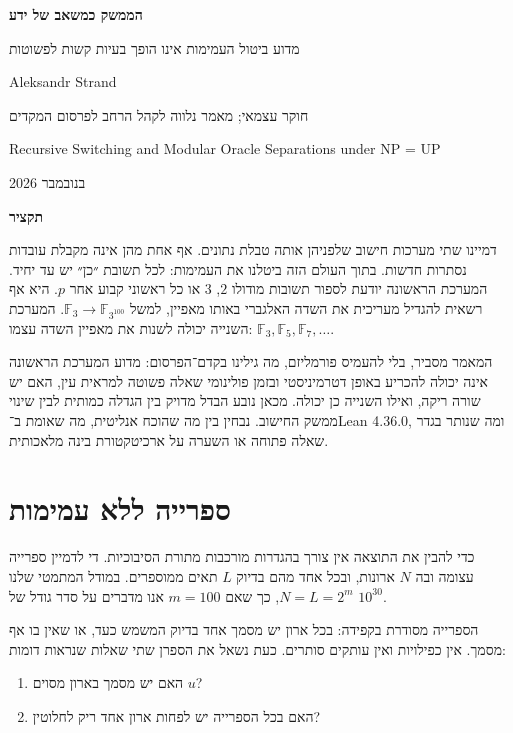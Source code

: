 \documentclass[11pt,a4paper]{article}
\newcommand{\EN}[1]{\textenglish{#1}}
\newcommand{\FF}{\mathbb F}
\begin{document}
\begin{center}
{\color{ink}\LARGE\bfseries הממשק כמשאב של ידע\par}
\vspace{2mm}
{\large מדוע ביטול העמימות אינו הופך בעיות קשות לפשוטות\par}
\vspace{3mm}
\EN{Aleksandr Strand}\par
חוקר עצמאי; מאמר נלווה לקהל הרחב לפרסום המקדים\par
\EN{Recursive Switching and Modular Oracle Separations under NP = UP}\par
{} בנובמבר 2026
\end{center}

\begin{center}\textbf{תקציר}\end{center}
דמיינו שתי מערכות חישוב שלפניהן אותה טבלת נתונים. אף אחת מהן אינה מקבלת עובדות נסתרות חדשות. בתוך העולם הזה ביטלנו את העמימות: לכל תשובת ״כן״ יש עד יחיד. המערכת הראשונה יודעת לספור תשובות מודולו $2$, $3$ או כל ראשוני קבוע אחר $p$. היא אף רשאית להגדיל מעריכית את השדה האלגברי באותו מאפיין, למשל $\FF_3\to\FF_{3^{100}}$. המערכת השנייה יכולה לשנות את מאפיין השדה עצמו: $\FF_3,\FF_5,\FF_7,\dots$.

המאמר מסביר, בלי להעמיס פורמליזם, מה גילינו בקדם־הפרסום: מדוע המערכת הראשונה אינה יכולה להכריע באופן דטרמיניסטי ובזמן פולינומי שאלה פשוטה למראית עין, האם יש שורה ריקה, ואילו השנייה כן יכולה. מכאן נובע הבדל מדויק בין הגדלה כמותית לבין שינוי ממשק החישוב. נבחין בין מה שהוכח אנליטית, מה שאומת ב־\EN{Lean 4.36.0}, ומה שנותר בגדר שאלה פתוחה או השערה על ארכיטקטורת בינה מלאכותית.

\section{ספרייה ללא עמימות}
כדי להבין את התוצאה אין צורך בהגדרות מורכבות מתורת הסיבוכיות. די לדמיין ספרייה עצומה ובה $N$ ארונות, ובכל אחד מהם בדיוק $L$ תאים ממוספרים. במודל המתמטי שלנו $N=L=2^m$, כך שאם $m=100$ אנו מדברים על סדר גודל של $10^{30}$.

הספרייה מסודרת בקפידה: בכל ארון יש מסמך אחד בדיוק המשמש כעד, או שאין בו אף מסמך. אין כפילויות ואין עותקים סותרים. כעת נשאל את הספרן שתי שאלות שנראות דומות:
\begin{enumerate}
\item האם יש מסמך בארון מסוים $u$?
\item האם בכל הספרייה יש לפחות ארון אחד ריק לחלוטין?
\end{enumerate}
\end{document}
